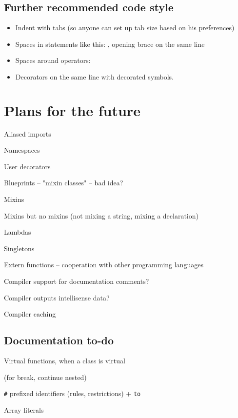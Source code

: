 \section{Further recommended code style}
\begin{itemize}
	\item Indent with tabs (so anyone can set up tab size based on his preferences)
	\item Spaces in statements like this: , opening brace on the same line
	\item Spaces around operators: 
	\item Decorators on the same line with decorated symbols.
\end{itemize}

\chapter{Plans for the future}
\begin{compactitem}
	\item Aliased imports
	\item Namespaces
	\item User decorators
	\item Blueprints -- "mixin classes" -- bad idea?
	\item Mixins
	\item Mixins but no mixins (not mixing a string, mixing a declaration)
	\item Lambdas
	\item Singletons
	\item Extern functions -- cooperation with other programming languages
	\item Compiler support for documentation comments?
	\item Compiler outputs intellisense data?
	\item Compiler caching
\end{compactitem}

\section{Documentation to-do}
\begin{compactitem}
	\item Virtual functions, when a class is virtual
	\item {}
	\item {} (for break, continue nested)
	\item {}
	\item \verb|#| prefixed identifiers (rules, restrictions) + \verb|to|
	\item {}
	\item Array literals
\end{compactitem}

